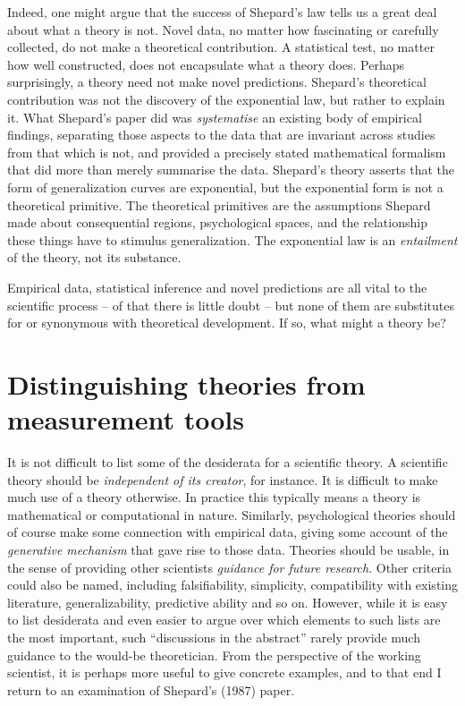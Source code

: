 \documentclass[english,doc]{apa6}
\begin{document}
Indeed, one might argue that the success of Shepard's law tells us a great deal about what a theory is not. Novel data, no matter how fascinating or carefully collected, do not make a theoretical contribution. A statistical test, no matter how well constructed, does not encapsulate what a theory does. Perhaps surprisingly, a theory need not make novel predictions. Shepard's theoretical contribution was not the discovery of the exponential law, but rather to explain it. What Shepard's paper did was \emph{systematise} an existing body of empirical findings, separating those aspects to the data that are invariant across studies from that which is not, and provided a precisely stated mathematical formalism that did more than merely summarise the data. Shepard's theory asserts that the form of generalization curves are exponential, but the exponential form is not a theoretical primitive. The theoretical primitives are the assumptions Shepard made about consequential regions, psychological spaces, and the relationship these things have to stimulus generalization. The exponential law is an \emph{entailment} of the theory, not its substance.

Empirical data, statistical inference and novel predictions are all vital to the scientific process -- of that there is little doubt -- but none of them are substitutes for or synonymous with theoretical development. If so, what might a theory be?

\hypertarget{distinguishing-theories-from-measurement-tools}{%
\section{Distinguishing theories from measurement tools}\label{distinguishing-theories-from-measurement-tools}}

It is not difficult to list some of the desiderata for a scientific theory. A scientific theory should be \emph{independent of its creator}, for instance. It is difficult to make much use of a theory otherwise. In practice this typically means a theory is mathematical or computational in nature. Similarly, psychological theories should of course make some connection with empirical data, giving some account of the \emph{generative mechanism} that gave rise to those data. Theories should be usable, in the sense of providing other scientists \emph{guidance for future research}. Other criteria could also be named, including falsifiability, simplicity, compatibility with existing literature, generalizability, predictive ability and so on. However, while it is easy to list desiderata and even easier to argue over which elements to such lists are the most important, such ``discussions in the abstract'' rarely provide much guidance to the would-be theoretician. From the perspective of the working scientist, it is perhaps more useful to give concrete examples, and to that end I return to an examination of Shepard's (1987) paper.
\end{document}
